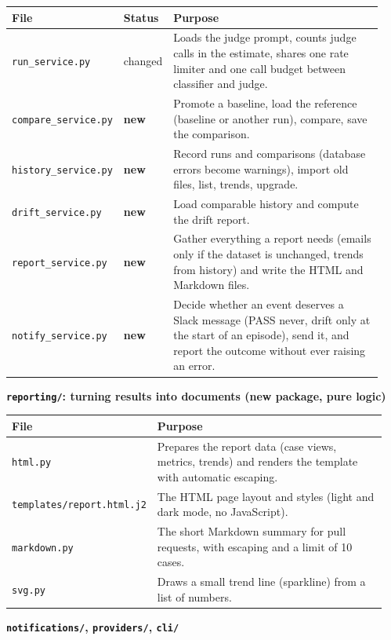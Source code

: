 \documentclass[11pt,a4paper]{article}
\newcommand{\code}[1]{\nolinkurl{#1}}
\newcommand{\new}{\textbf{new}}
\begin{document}
\begin{longtable}{@{}p{0.22\linewidth}p{0.09\linewidth}p{0.63\linewidth}@{}}
\toprule
\textbf{File} & \textbf{Status} & \textbf{Purpose} \\
\midrule
\endhead
\code{run_service.py} & changed & Loads the judge prompt, counts judge calls in the estimate, shares one rate limiter and one call budget between classifier and judge. \\
\code{compare_service.py} & \new & Promote a baseline, load the reference (baseline or another run), compare, save the comparison. \\
\code{history_service.py} & \new & Record runs and comparisons (database errors become warnings), import old files, list, trends, upgrade. \\
\code{drift_service.py} & \new & Load comparable history and compute the drift report. \\
\code{report_service.py} & \new & Gather everything a report needs (emails only if the dataset is unchanged, trends from history) and write the HTML and Markdown files. \\
\code{notify_service.py} & \new & Decide whether an event deserves a Slack message (PASS never, drift only at the start of an episode), send it, and report the outcome without ever raising an error. \\
\bottomrule
\end{longtable}

\textbf{\code{reporting/}: turning results into documents (new package, pure logic)}

\begin{longtable}{@{}p{0.28\linewidth}p{0.67\linewidth}@{}}
\toprule
\textbf{File} & \textbf{Purpose} \\
\midrule
\endhead
\code{html.py} & Prepares the report data (case views, metrics, trends) and renders the template with automatic escaping. \\
\code{templates/report.html.j2} & The HTML page layout and styles (light and dark mode, no JavaScript). \\
\code{markdown.py} & The short Markdown summary for pull requests, with escaping and a limit of 10 cases. \\
\code{svg.py} & Draws a small trend line (sparkline) from a list of numbers. \\
\bottomrule
\end{longtable}

\newpage
\textbf{\code{notifications/}, \code{providers/}, \code{cli/}}
\end{document}
